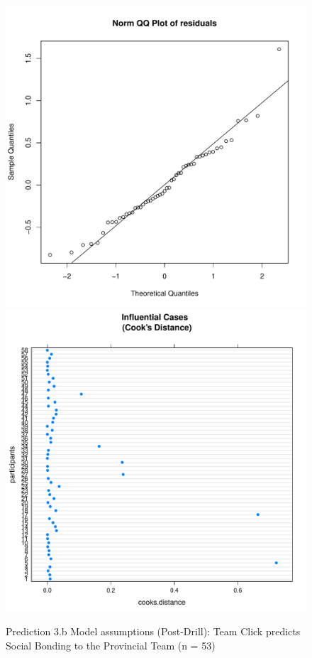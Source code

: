 \begin{CJK}{UTF8}{gbsn}
\begin{figure}[htbp]
    \includegraphics[scale =.4]{images/TEM2TeamQQNorm.pdf}
    \includegraphics[scale =.4]{images/TEM2TeamCooksD.pdf}
    \caption{Prediction 3.b Model assumptions (Post-Drill): Team Click predicts Social Bonding to the Provincial Team (n = 53)}
    \label{fig:M2bTeamAssumptions}
\end{figure}




\end{CJK}
